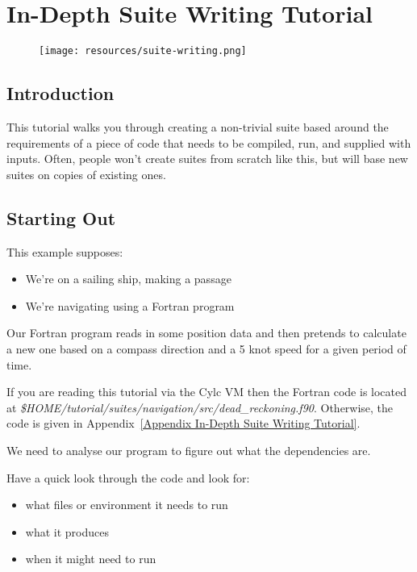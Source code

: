 \section{In-Depth Suite Writing Tutorial}
\label{In-Depth Suite Writing Tutorial}

\begin{figure}[htp]
\texttt{[image: resources/suite-writing.png]}
\end{figure}

\subsection{Introduction}

This tutorial walks you through creating a non-trivial suite based around the requirements of a piece of code that needs to be compiled, run, and supplied with inputs. Often, people won't create suites from scratch like this, but will base new suites on copies of existing ones.

\subsection{Starting Out}

This example supposes:
\begin{itemize}
    \item We're on a sailing ship, making a passage
    \item We're navigating using a Fortran program
\end{itemize}

Our Fortran program reads in some position data and then pretends to calculate a new one based on a compass direction and a 5 knot speed for a given period of time.

If you are reading this tutorial via the Cylc VM then the Fortran code is located at {\em \$HOME/tutorial/suites/navigation/src/dead\_reckoning.f90}. Otherwise, the code is given in Appendix~\ref{Appendix In-Depth Suite Writing Tutorial}.

We need to analyse our program to figure out what the dependencies are.

Have a quick look through the code and look for:
\begin{itemize}
    \item what files or environment it needs to run
    \item what it produces
    \item when it might need to run
\end{itemize}


